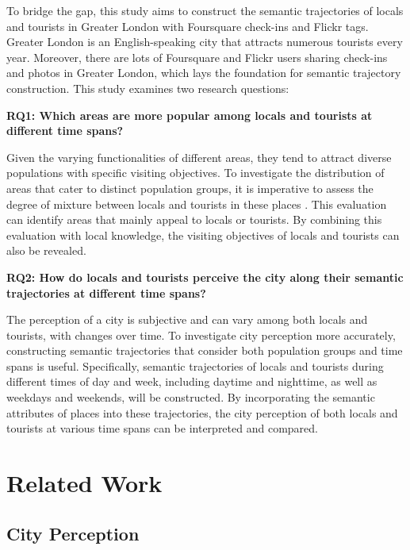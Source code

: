 \documentclass{article}
\theoremstyle{definition}
\theoremstyle{remark}
\begin{document}
To bridge the gap, this study aims to construct the semantic trajectories of locals and tourists in Greater London with Foursquare check-ins and Flickr tags. Greater London is an English-speaking city that attracts numerous tourists every year. Moreover, there are lots of Foursquare and Flickr users sharing check-ins and photos in Greater London, which lays the foundation for semantic trajectory construction. This study examines two research questions:

\textbf{RQ1: Which areas are more popular among locals and tourists at different time spans?}

Given the varying functionalities of different areas, they tend to attract diverse populations with specific visiting objectives. To investigate the distribution of areas that cater to distinct population groups, it is imperative to assess the degree of mixture between locals and tourists in these places \citep{li_analyzing_2018}. This evaluation can identify areas that mainly appeal to locals or tourists. By combining this evaluation with local knowledge, the visiting objectives of locals and tourists can also be revealed.

\textbf{RQ2: How do locals and tourists perceive the city along their semantic trajectories at different time spans?}

The perception of a city is subjective and can vary among both locals and tourists, with changes over time. To investigate city perception more accurately, constructing semantic trajectories that consider both population groups and time spans is useful. Specifically, semantic trajectories of locals and tourists during different times of day and week, including daytime and nighttime, as well as weekdays and weekends, will be constructed. By incorporating the semantic attributes of places into these trajectories, the city perception of both locals and tourists at various time spans can be interpreted and compared.

\clearpage

\section{Related Work}
\subsection{City Perception}
\end{document}
